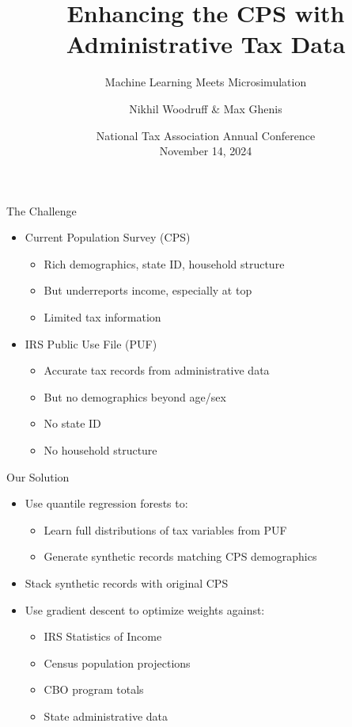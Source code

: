 \documentclass{beamer}
\title{Enhancing the CPS with Administrative Tax Data}
\subtitle{Machine Learning Meets Microsimulation}
\author[Woodruff \& Ghenis]{Nikhil Woodruff \& Max Ghenis}
\institute{PolicyEngine}
\date{National Tax Association Annual Conference\\November 14, 2024}
\begin{document}
\begin{frame}
    \titlepage
\end{frame}

\begin{frame}{The Challenge}
    \begin{itemize}
        \item Current Population Survey (CPS)
        \begin{itemize}
            \item Rich demographics, state ID, household structure
            \item But underreports income, especially at top
            \item Limited tax information
        \end{itemize}
        \pause
        \item IRS Public Use File (PUF)
        \begin{itemize}
            \item Accurate tax records from administrative data
            \item But no demographics beyond age/sex
            \item No state ID
            \item No household structure
        \end{itemize}
    \end{itemize}
\end{frame}

\begin{frame}{Our Solution}
    \begin{itemize}
        \item Use quantile regression forests to:
        \begin{itemize}
            \item Learn full distributions of tax variables from PUF
            \item Generate synthetic records matching CPS demographics
        \end{itemize}
        \pause
        \item Stack synthetic records with original CPS
        \pause
        \item Use gradient descent to optimize weights against:
        \begin{itemize}
            \item IRS Statistics of Income
            \item Census population projections
            \item CBO program totals
            \item State administrative data
        \end{itemize}
    \end{itemize}
\end{frame}
\end{document}
